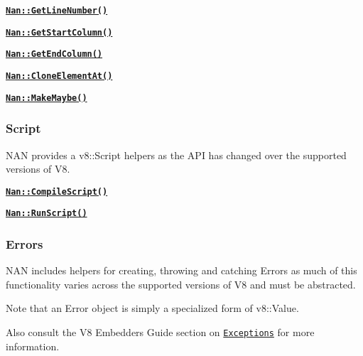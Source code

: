 \begin{DoxyItemize}
\begin{DoxyItemize}
\item \href{doc/maybe_types.md#api_nan_get_line_number}{\tt {\bfseries {\ttfamily Nan\+::\+Get\+Line\+Number()}}}
\item \href{doc/maybe_types.md#api_nan_get_start_column}{\tt {\bfseries {\ttfamily Nan\+::\+Get\+Start\+Column()}}}
\item \href{doc/maybe_types.md#api_nan_get_end_column}{\tt {\bfseries {\ttfamily Nan\+::\+Get\+End\+Column()}}}
\item \href{doc/maybe_types.md#api_nan_clone_element_at}{\tt {\bfseries {\ttfamily Nan\+::\+Clone\+Element\+At()}}}
\item \href{doc/maybe_types.md#api_nan_make_maybe}{\tt {\bfseries {\ttfamily Nan\+::\+Make\+Maybe()}}}
\end{DoxyItemize}
\end{DoxyItemize}

\subsubsection*{Script}

N\+AN provides a {\ttfamily v8\+::\+Script} helpers as the A\+PI has changed over the supported versions of V8.


\begin{DoxyItemize}
\item \href{doc/script.md#api_nan_compile_script}{\tt {\bfseries {\ttfamily Nan\+::\+Compile\+Script()}}}
\item \href{doc/script.md#api_nan_run_script}{\tt {\bfseries {\ttfamily Nan\+::\+Run\+Script()}}}
\end{DoxyItemize}

\subsubsection*{Errors}

N\+AN includes helpers for creating, throwing and catching Errors as much of this functionality varies across the supported versions of V8 and must be abstracted.

Note that an Error object is simply a specialized form of {\ttfamily v8\+::\+Value}.

Also consult the V8 Embedders Guide section on \href{https://developers.google.com/v8/embed#exceptions}{\tt Exceptions} for more information.


